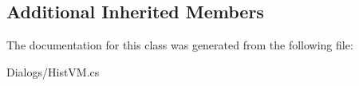 \subsection*{Additional Inherited Members}


The documentation for this class was generated from the following file\+:\begin{DoxyCompactItemize}
\item 
Dialogs/Hist\+V\+M.\+cs\end{DoxyCompactItemize}
